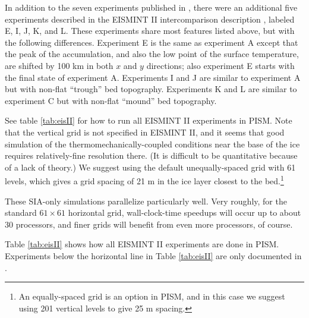In addition to the seven experiments published in \cite{EISMINT00}, there were an additional five experiments described in the EISMINT II intercomparison description 
\cite{EISIIdescribe}, labeled E, I, J, K, and L.  These experiments share most features listed above, but with the following differences.  Experiment E is the same as experiment A except that the peak of the accumulation, and also the low point of the surface temperature, are shifted by 100 km in both $x$ and $y$ directions; also experiment E starts with the final state of experiment A.  Experiments I and J are similar to experiment A but with non-flat ``trough'' bed topography.  Experiments K and L are similar to experiment C but with non-flat ``mound'' bed topography.

See table \ref{tab:eisII} for how to run all EISMINT II experiments in PISM.  Note that the vertical grid is not specified in EISMINT II, and it seems that good simulation of the thermomechanically-coupled conditions near the base of the ice requires relatively-fine resolution there.  (It is difficult to be quantitative because of a lack of theory.)  We suggest using the default unequally-spaced grid with 61 levels, which gives a grid spacing of 21 m in the ice layer closest to the bed.\footnote{An equally-spaced grid is an option in PISM, and in this case we suggest using 201 vertical levels to give 25 m spacing.}

These SIA-only simulations parallelize particularly well.  Very roughly, for the standard $61\times 61$ horizontal grid, wall-clock-time speedups will occur up to about 30 processors, and finer grids will benefit from even more processors, of course.

Table \ref{tab:eisII} shows how all EISMINT II experiments are done in PISM.  Experiments below the horizontal line in Table \ref{tab:eisII} are only documented in \cite{EISIIdescribe}.

